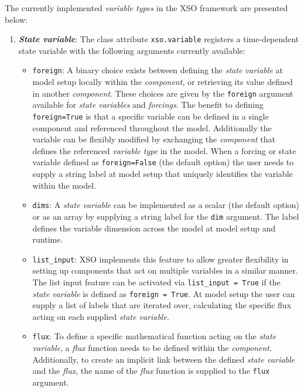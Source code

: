 \documentclass[journal abbreviation, manuscript]{copernicus}
\begin{document}
The currently implemented \textit{variable types} in the XSO framework are presented below:
\begin{enumerate}
    \item \textbf{\textit{State variable}}: The class attribute \texttt{xso.variable} registers a time-dependent state variable with the following arguments currently available:
    \begin{itemize}
        \item \texttt{foreign}: A binary choice exists between defining the \textit{state variable} at model setup locally within the \textit{component}, or retrieving its value defined in another \textit{component}. These choices are given by the \texttt{foreign} argument available for \textit{state variables} and \textit{forcings}. The benefit to defining \texttt{foreign=True} is that a specific variable can be defined in a single component and referenced throughout the model. Additionally the variable can be flexibly modified by exchanging the \textit{component} that defines the referenced \textit{variable type} in the model. When a forcing or state variable defined as \texttt{foreign=False} (the default option) the user needs to supply a string label at model setup that uniquely identifies the variable within the model.
        
        \item \texttt{dims}: A \textit{state variable} can be implemented as a scalar (the default option) or as an array by supplying a string label for the \texttt{dim} argument. The label defines the variable dimension across the model at model setup and runtime.
        
        \item \texttt{list\_input}: XSO implements this feature to allow greater flexibility in setting up components that act on multiple variables in a similar manner. The list input feature can be activated via \texttt{list\_input = True} if the \textit{state variable} is defined as \texttt{foreign = True}. At model setup the user can supply a list of labels that are iterated over, calculating the specific flux acting on each supplied \textit{state variable}.
        
        \item \texttt{flux}: To define a specific mathematical function acting on the \textit{state variable}, a \textit{flux} function needs to be defined within the \textit{component}. Additionally, to create an implicit link between the defined \textit{state variable} and the \textit{flux}, the name of the \textit{flux} function is supplied to the \texttt{flux} argument.
        

\end{itemize}
\end{enumerate}
\end{document}
